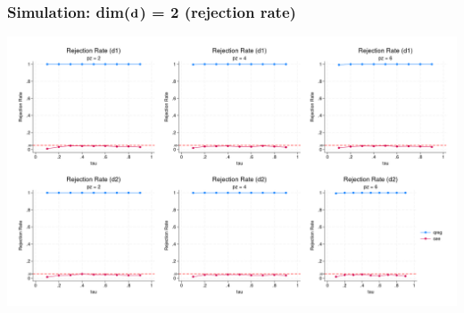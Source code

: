 \documentclass[11pt]{beamer}
\begin{document}
\begin{frame}
  \frametitle{Simulation: dim($\mathbf{d}$) = 2 (rejection rate)}
  \begin{center} 
\includegraphics[scale=0.2]{eps/rej_d2}
\end{center}
\end{frame}






\end{document}
